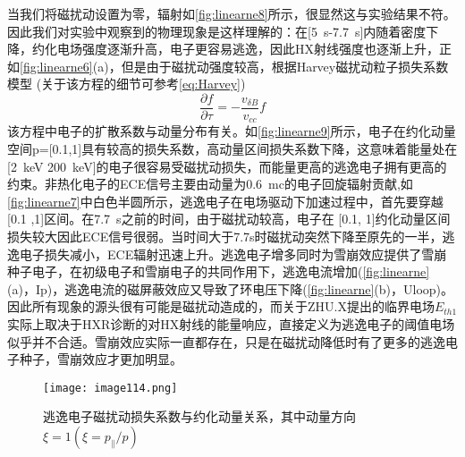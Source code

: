 当我们将磁扰动设置为零，辐射如\autoref{fig:linearne8}所示，很显然这与实验结果不符。
因此我们对实验中观察到的物理现象是这样理解的：在[5~s-7.7~s]内随着密度下降，约化电场强度逐渐升高，电子更容易逃逸，因此HX射线强度也逐渐上升，正如\autoref{fig:linearne6}(a)，但是由于磁扰动强度较高，根据Harvey磁扰动粒子损失系数模型\cite{RN2076} (关于该方程的细节可参考\autoref{eq:Harvey})
\begin{equation}
\frac{\partial f}{\partial \tau}=-\frac{v_{\delta B}}{v_{c c}} f
\end{equation}
该方程中电子的扩散系数与动量分布有关。如\autoref{fig:linearne9}所示，电子在约化动量空间p=[0.1,1]具有较高的损失系数，高动量区间损失系数下降，这意味着能量处在[2~keV 200~keV]的电子很容易受磁扰动损失，而能量更高的逃逸电子拥有更高的约束。非热化电子的ECE信号主要由动量为0.6~mc的电子回旋辐射贡献,如\autoref{fig:linearne7}中白色半圆所示，逃逸电子在电场驱动下加速过程中，首先要穿越[0.1 ,1]区间。在7.7~s之前的时间，由于磁扰动较高，电子在 [0.1, 1]约化动量区间损失较大因此ECE信号很弱。当时间大于7.7s时磁扰动突然下降至原先的一半，逃逸电子损失减小，ECE辐射迅速上升。逃逸电子增多同时为雪崩效应提供了雪崩种子电子，在初级电子和雪崩电子的共同作用下，逃逸电流增加(\autoref{fig:linearne}(a)，Ip)，逃逸电流的磁屏蔽效应又导致了环电压下降(\autoref{fig:linearne}(b)，Uloop)。因此所有现象的源头很有可能是磁扰动造成的，而关于ZHU.X提出的临界电场$E_{th1}$实际上取决于HXR诊断的对HX射线的能量响应，直接定义为逃逸电子的阈值电场似乎并不合适。雪崩效应实际一直都存在，只是在磁扰动降低时有了更多的逃逸电子种子，雪崩效应才更加明显。
\begin{figure}
\centering
\texttt{[image: image114.png]}
\caption{\label{fig:linearne9}逃逸电子磁扰动损失系数与约化动量关系，其中动量方向$ξ=1(ξ=p_∥/p)$}
\end{figure}
\clearpage
